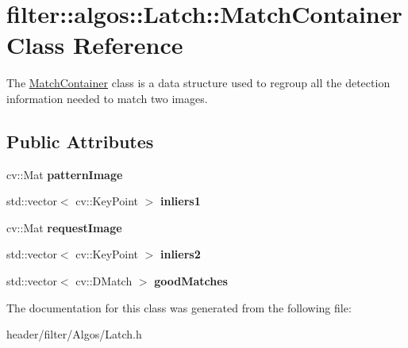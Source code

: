 \hypertarget{classfilter_1_1algos_1_1_latch_1_1_match_container}{}\section{filter\+:\+:algos\+:\+:Latch\+:\+:Match\+Container Class Reference}
\label{classfilter_1_1algos_1_1_latch_1_1_match_container}


The \hyperlink{classfilter_1_1algos_1_1_latch_1_1_match_container}{Match\+Container} class is a data structure used to regroup all the detection information needed to match two images.  


\subsection*{Public Attributes}
\begin{DoxyCompactItemize}
\item 
\mbox{\label{classfilter_1_1algos_1_1_latch_1_1_match_container_a19f95e757ec19990be55e37422188ae2}} 
cv\+::\+Mat {\bfseries pattern\+Image}
\item 
\mbox{\label{classfilter_1_1algos_1_1_latch_1_1_match_container_afcc5181c3795e93e6a03d76d263e6aef}} 
std\+::vector$<$ cv\+::\+Key\+Point $>$ {\bfseries inliers1}
\item 
\mbox{\label{classfilter_1_1algos_1_1_latch_1_1_match_container_ab6a1a40651db00945618c858b4c3d84b}} 
cv\+::\+Mat {\bfseries request\+Image}
\item 
\mbox{\label{classfilter_1_1algos_1_1_latch_1_1_match_container_aee376b7b98a52f9ee73824eaa08b0d37}} 
std\+::vector$<$ cv\+::\+Key\+Point $>$ {\bfseries inliers2}
\item 
\mbox{\label{classfilter_1_1algos_1_1_latch_1_1_match_container_a676bf8f0c78a257b54083f6133956503}} 
std\+::vector$<$ cv\+::\+D\+Match $>$ {\bfseries good\+Matches}
\end{DoxyCompactItemize}


The documentation for this class was generated from the following file\+:\begin{DoxyCompactItemize}
\item 
header/filter/\+Algos/Latch.\+h\end{DoxyCompactItemize}
